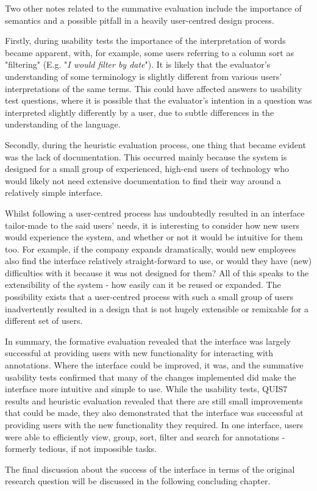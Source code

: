 Two other notes related to the summative evaluation include the importance of semantics and a possible pitfall in a heavily user-centred design process. 

Firstly, during usability tests the importance of the interpretation of words became apparent, with, for example, some users referring to a column sort as "filtering" (E.g. "\textit{I would filter by date}"). It is likely that the evaluator's understanding of some terminology is slightly different from various users' interpretations of the same terms. This could have affected answers to usability test questions, where it is possible that the evaluator's intention in a question was interpreted slightly differently by a user, due to subtle differences in the understanding of the language. 

Secondly, during the heuristic evaluation process, one thing that became evident was the lack of documentation. This occurred mainly because the system is designed for a small group of experienced, high-end users of technology who would likely not need extensive documentation to find their way around a relatively simple interface.  

Whilst following a user-centred process has undoubtedly resulted in an interface tailor-made to the said users' needs, it is interesting to consider how new users would experience the system, and whether or not it would be intuitive for them too. For example, if the company expands dramatically, would new employees also find the interface relatively straight-forward to use, or would they have (new) difficulties with it because it was not designed for them? All of this speaks to the extensibility of the system - how easily can it be reused or expanded. The possibility exists that a user-centred process with such a small group of users inadvertently resulted in a design that is not hugely extensible or remixable for a different set of users.

In summary, the formative evaluation revealed that the interface was largely successful at providing users with new functionality for interacting with annotations. Where the interface could be improved, it was, and the summative usability tests confirmed that many of the changes implemented did make the interface more intuitive and simple to use. While the usability tests, QUIS7 results and heuristic evaluation revealed that there are still small improvements that could be made, they also demonstrated that the interface was successful at providing users with the new functionality they required. In one interface, users were able to efficiently view, group, sort, filter and search for annotations - formerly tedious, if not impossible tasks. 

The final discussion about the success of the interface in terms of the original research question will be discussed in the following concluding chapter. 

